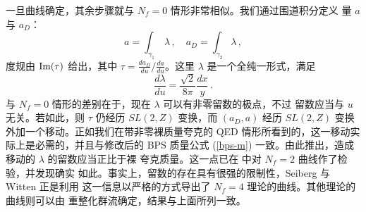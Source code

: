 一旦曲线确定，其余步骤就与 $N_f=0$ 情形非常相似。我们通过围道积分定义
量 $a$ 与 $a_D$：
$$
a=\int_{\gamma_1} \, \lambda\,,\quad a_D=\int_{\gamma_2}\lambda\,,
$$
度规由 ${\rm Im}(\tau)$ 给出，其中 $\tau=\frac{da_D}{du}/
\frac{da}{du}$。这里 $\lambda$ 是一个全纯一形式，满足
$$ 
\frac{d\lambda}{du}=\frac{\sqrt 2}{8\pi}\frac{dx}{y}\,.
$$
与 $N_f=0$ 情形的差别在于，现在 $\lambda$ 可以有非零留数的极点，不过
留数应当与 $u$ 无关。若如此，则 $\tau$ 仍经历 $SL(2,Z)$ 变换，而
$(a_D, a)$ 经历 $SL(2,Z)$ 变换外加一个移动。正如我们在带非零裸质量夸克的
QED 情形所看到的，这一移动实际上是必需的，并且与修改后的 BPS 质量公式
(\ref{bps-m}) 一致。由此推出，造成移动的 $\lambda$ 的留数应当正比于裸
夸克质量。这一点已在 \cite{SW2} 中对 $N_f=2$ 曲线作了检验，并发现确实
如此。事实上，留数的存在具有很强的限制性，Seiberg 与 Witten 正是利用
这一信息以严格的方式导出了 $N_f=4$ 理论的曲线。其他理论的曲线则可以由
重整化群流确定，结果与上面所列一致。


